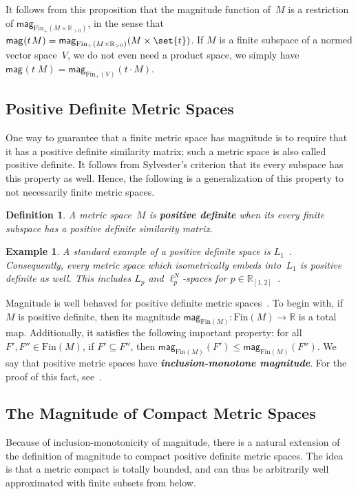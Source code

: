 \documentclass[11pt]{article}
\theoremstyle{plain}
\newtheorem{example}[theorem]{Example}
\newtheorem{definition}[theorem]{Definition}
\theoremstyle{definition}
\newcommand{\df}[1]{\emph{\textbf{#1}}}  %
\newcommand{\RR}{\mathbb{R}}
\newcommand{\intcc}[3][\RR]{{#1}_{[#2, #3]}}
\newcommand{\mg}[1][]{\mathsf{mag}_{#1}}
\newcommand{\fsub}{\mathrm{Fin}}
\newcommand{\ifsub}{\fsub_{+}}
\begin{document}
It follows from this proposition that the magnitude function of~$M$ is a restriction of $\mg[\ifsub(M \times \RR_{> 0})]$, in the sense that $\mg(t\;\!M) = \mg[\ifsub(M \times \RR_{> 0})](M \times \set{t})$. If $M$ is a finite subspace of a normed vector space~$V$, we do not even need a product space, we simply have $\mg(t\;\!M) = \mg[\ifsub(V)](t \cdot M)$.

\subsection{Positive Definite Metric Spaces}

One way to guarantee that a finite metric space has magnitude is to require that it has a positive definite similarity matrix; such a metric space is also called positive definite. It follows from Sylvester's criterion that its every subspace has this property as well. Hence, the following is a generalization of this property to not necessarily finite metric spaces.

\begin{definition}
A metric space~$M$ is \df{positive definite} when its every finite subspace has a positive definite similarity matrix.
\end{definition}

\begin{example}
A standard example of a positive definite space is $L_1$~\cite[Theorem~3.6]{meckes2013}. Consequently, every metric space which isometrically embeds into~$L_1$ is positive definite as well. This includes $L_p$ and $\ell_p^N$-spaces for $p \in \intcc{1}{2}$~\cite[Theorem 2.1]{Dor1976}.   
\end{example}

Magnitude is well behaved for positive definite metric spaces~\cite{meckes2013}. To begin with, if $M$ is positive definite, then its magnitude $\mg[\fsub(M)]\colon \fsub(M) \to \RR$ is a total map. Additionally, it satisfies the following important property: for all $F', F'' \in \fsub(M)$, if $F' \subseteq F''$, then $\mg[\fsub(M)](F') \leq \mg[\fsub(M)](F'')$. We say that positive metric spaces have \df{inclusion-monotone magnitude}. For the proof of this fact, see~\cite[
Corollary 2.4.4]{leinster2010}.

\subsection{The Magnitude of Compact Metric Spaces}

Because of inclusion-monotonicity of magnitude, there is a natural extension of the definition of magnitude to compact positive definite metric spaces. The idea is that a metric compact is totally bounded, and can thus be arbitrarily well approximated with finite subsets from below.
\end{document}
